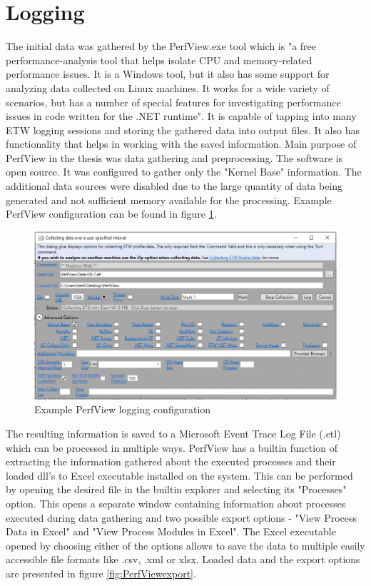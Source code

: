 \documentclass[a4paper,twoside,12pt]{book}
\begin{document}
\section{Logging}

The initial data was gathered by the PerfView.exe tool which is "a free performance-analysis 
tool that helps isolate CPU and memory-related performance issues. It is a Windows tool, 
but it also has some support for analyzing data collected on Linux machines. It works for 
a wide variety of scenarios, but has a number of special features for investigating 
performance issues in code written for the .NET runtime"\cite{bib:PerfView}. It is capable of 
tapping into many ETW logging sessions and storing the gathered data into output files. It also 
has functionality that helps in working with the saved information. Main purpose of PerfView 
in the thesis was data gathering and preprocessing. The software is open source.
It was configured to gather only the "Kernel Base" information. The additional data sources 
were disabled due to the large quantity of data being generated and not sufficient memory 
available for the processing. Example PerfView configuration can be found in figure 
\ref{fig:PerfViewConfig}. 

\begin{figure}
	\centering
	\includegraphics[scale=0.55]{images/perf_config}
	\caption{Example PerfView logging configuration}
	\label{fig:PerfViewConfig}
 \end{figure}

The resulting information is saved to a Microsoft Event Trace Log File (.etl) which can be 
processed in multiple ways. PerfView has a builtin function of extracting the information 
gathered about the executed processes and their loaded dll's to Excel executable installed 
on the system. This can be performed by opening the desired file in the builtin explorer 
and selecting its "Processes" option. This opens a separate window containing information 
about processes executed during data gathering and two possible export options - 
"View Process Data in Excel" and "View Process Modules in Excel". The Excel executable 
opened by choosing either of the options allows to save the data to multiple easily 
accessible file formats like .csv, .xml or xlsx. Loaded data and the export options are 
presented in figure \ref{fig:PerfViewexport}.
\end{document}
